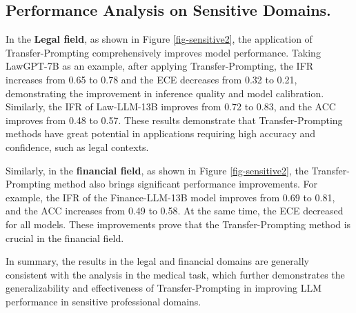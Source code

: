 


\subsection{Performance Analysis on Sensitive Domains.}
In the \textbf{Legal field}, as shown in Figure \ref{fig-sensitive2}, the application of Transfer-Prompting comprehensively improves model performance. Taking LawGPT-7B as an example, after applying Transfer-Prompting, the IFR increases from 0.65 to 0.78 and the ECE decreases from 0.32 to 0.21, demonstrating the improvement in inference quality and model calibration. Similarly, the IFR of Law-LLM-13B improves from 0.72 to 0.83, and the ACC improves from 0.48 to 0.57. These results demonstrate that Transfer-Prompting methods have great potential in applications requiring high accuracy and confidence, such as legal contexts.

Similarly, in the \textbf{financial field}, as shown in Figure \ref{fig-sensitive2}, the Transfer-Prompting method also brings significant performance improvements. For example, the IFR of the Finance-LLM-13B model improves from 0.69 to 0.81, and the ACC increases from 0.49 to 0.58. At the same time, the ECE decreased for all models. These improvements prove that the Transfer-Prompting method is crucial in the financial field.

In summary, the results in the legal and financial domains are generally consistent with the analysis in the medical task, which further demonstrates the generalizability and effectiveness of Transfer-Prompting in improving LLM performance in sensitive professional domains.

